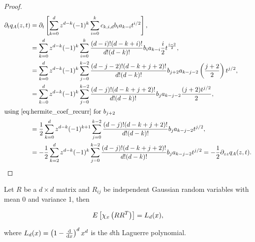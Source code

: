 \begin{proof}
        \begin{align*}
            \partial_t q_A(z,t) &= \partial_t \left[ \sum_{k=0}^d z^{d-k}(-1)^k \sum_{i=0}^k c_{k,i,d} b_i a_{k-i} t^{i/2} \right],\\ 
            &= \sum_{k=0}^d z^{d-k}(-1)^k \sum_{i=0}^k \frac{(d-i)!(d-k+i)!}{d!(d-k)!} b_i a_{k-i} \frac{i}{2}t^{\frac{i-2}{2}},\\ 
            &= \sum_{k=0}^d z^{d-k}(-1)^k \sum_{j=0}^{k-2} \frac{(d-j-2)!(d-k+j+2)!}{d!(d-k)!} b_{j+2}a_{k-j-2}\left( \frac{j+2}{2} \right)t^{j/2},\\ 
            &= \sum_{k=0}^d z^{d-k}(-1)^k \sum_{j=0}^{k-2} \frac{(d-j)!(d-k+j+2)!}{d!(d-k)!} b_ja_{k-j-2}\frac{(j+2)t^{j/2}}2,\\
            \intertext{using \eqref{eq:hermite_coef_recurr} for $b_{j+2}$} 
            &= \frac12 \sum_{k=0}^d z^{d-k}(-1)^{k+1} \sum_{j=0}^{k-2} \frac{(d-j)!(d-k+j+2)!}{d!(d-k)!} b_ja_{k-j-2}t^{j/2}, \\ 
            &= -\frac12 \sum_{k=2}^d z^{d-k}(-1)^{k} \sum_{j=0}^{k-2} \frac{(d-j)!(d-k+j+2)!}{d!(d-k)!} b_ja_{k-j-2}t^{j/2} = -\frac12 \partial_{zz} q_A(z,t).
        \end{align*}





    \end{proof}
    







\begin{theorem}
    Let $R$ be a $d\times d$ matrix and $R_{ij}$ be independent Gaussian random variables with mean 0 and variance 1, then

    \begin{equation*}
        E\left[ \chi_x\left(RR^T\right) \right] = L_d(x),
    \end{equation*}

    \noindent where $L_d(x) = \left( 1 - \frac{\mathrm d}{\mathrm d x} \right)^d x^d$ is the $d$th Laguerre polynomial.
\end{theorem}

